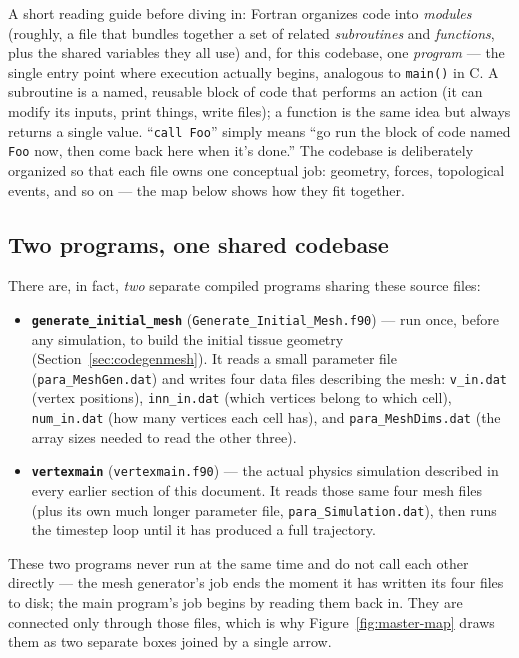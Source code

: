 \documentclass[11pt]{article}
\begin{document}
A short reading guide before diving in: Fortran organizes code into \emph{modules}
(roughly, a file that bundles together a set of related \emph{subroutines} and
\emph{functions}, plus the shared variables they all use) and, for this codebase, one
\emph{program} --- the single entry point where execution actually begins, analogous to
\texttt{main()} in C. A subroutine is a named, reusable block of code that performs an
action (it can modify its inputs, print things, write files); a function is the same
idea but always returns a single value. ``\texttt{call Foo}'' simply means ``go run
the block of code named \texttt{Foo} now, then come back here when it's done.'' The
codebase is deliberately organized so that each file owns one conceptual job: geometry,
forces, topological events, and so on --- the map below shows how they fit together.

\subsection{Two programs, one shared codebase}

There are, in fact, \emph{two} separate compiled programs sharing these source files:

\begin{itemize}[leftmargin=1.5em]
  \item \textbf{\texttt{generate\_initial\_mesh}} (\texttt{Generate\_Initial\_Mesh.f90}) ---
  run once, before any simulation, to build the initial tissue geometry (Section~\ref{sec:codegenmesh}).
  It reads a small parameter file (\texttt{para\_MeshGen.dat}) and writes four data files
  describing the mesh: \texttt{v\_in.dat} (vertex positions), \texttt{inn\_in.dat}
  (which vertices belong to which cell), \texttt{num\_in.dat} (how many vertices each
  cell has), and \texttt{para\_MeshDims.dat} (the array sizes needed to read the other
  three).
  \item \textbf{\texttt{vertexmain}} (\texttt{vertexmain.f90}) --- the actual physics
  simulation described in every earlier section of this document. It reads those same
  four mesh files (plus its own much longer parameter file, \texttt{para\_Simulation.dat}),
  then runs the timestep loop until it has produced a full trajectory.
\end{itemize}

These two programs never run at the same time and do not call each other directly ---
the mesh generator's job ends the moment it has written its four files to disk; the
main program's job begins by reading them back in. They are connected only through
those files, which is why Figure~\ref{fig:master-map} draws them as two separate boxes
joined by a single arrow.
\end{document}
